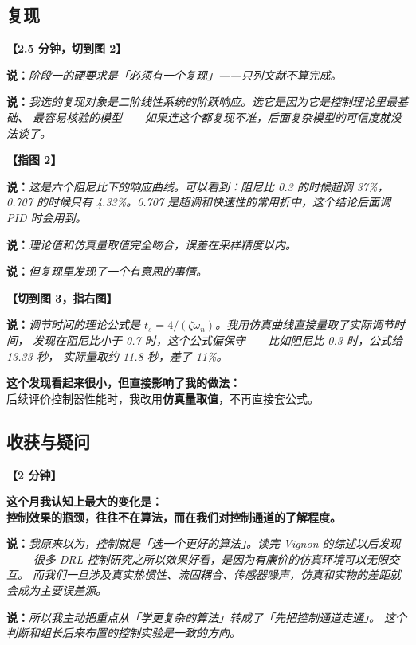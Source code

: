 \documentclass[11pt,a4paper]{ctexart}
\newcommand{\shuo}[1]{\par{\color{cBlue}\bfseries 说：}{\itshape #1}\par}
\newcommand{\dongzuo}[1]{\par{\color{cWarnLine}\bfseries 【#1】}\par}
\begin{document}
\subsection{复现}

\dongzuo{2.5 分钟，切到图 2}

\shuo{阶段一的硬要求是「必须有一个复现」——只列文献不算完成。}

\shuo{我选的复现对象是二阶线性系统的阶跃响应。选它是因为它是控制理论里最基础、
最容易核验的模型——如果连这个都复现不准，后面复杂模型的可信度就没法谈了。}

\dongzuo{指图 2}

\shuo{这是六个阻尼比下的响应曲线。可以看到：阻尼比 0.3 的时候超调 37\%，
0.707 的时候只有 4.33\%。0.707 是超调和快速性的常用折中，这个结论后面调 PID 时会用到。}

\shuo{理论值和仿真量取值完全吻合，误差在采样精度以内。}

\shuo{但复现里发现了一个有意思的事情。}

\dongzuo{切到图 3，指右图}

\shuo{调节时间的理论公式是 $t_s = 4/(\zeta\omega_n)$。我用仿真曲线直接量取了实际调节时间，
发现在阻尼比小于 0.7 时，这个公式偏保守——比如阻尼比 0.3 时，公式给 13.33 秒，
实际量取约 11.8 秒，差了 11\%。}

\begin{yaodian}
\textbf{这个发现看起来很小，但直接影响了我的做法：}\\
后续评价控制器性能时，我改用\textbf{仿真量取值}，不再直接套公式。
\end{yaodian}

\subsection{收获与疑问}

\dongzuo{2 分钟}

\begin{yaodian}
\textbf{这个月我认知上最大的变化是：}\\
\textbf{控制效果的瓶颈，往往不在算法，而在我们对控制通道的了解程度。}
\end{yaodian}

\shuo{我原来以为，控制就是「选一个更好的算法」。读完 Vignon 的综述以后发现——
很多 DRL 控制研究之所以效果好看，是因为有廉价的仿真环境可以无限交互。
而我们一旦涉及真实热惯性、流固耦合、传感器噪声，仿真和实物的差距就会成为主要误差源。}

\shuo{所以我主动把重点从「学更复杂的算法」转成了「先把控制通道走通」。
这个判断和组长后来布置的控制实验是一致的方向。}
\end{document}
